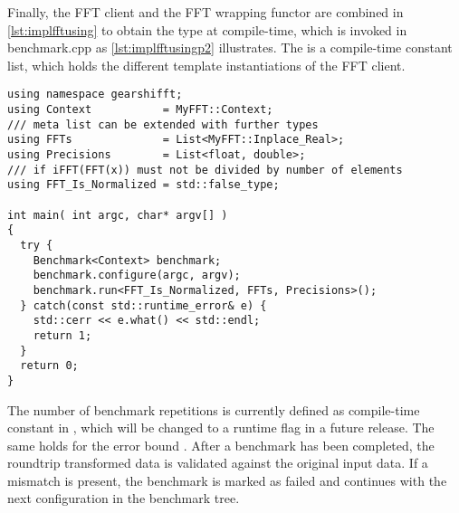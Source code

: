 Finally, the FFT client and the FFT wrapping functor are combined in \cref{lst:implfftusing} to obtain the type at compile-time, which is invoked in benchmark.cpp as \cref{lst:implfftusingp2} illustrates. The  is a compile-time constant list, which holds the different template instantiations of the FFT client. 

\begin{lstlisting}[caption={Using FFT client types to run the benchmarks},label={lst:implfftusingp2}]
using namespace gearshifft;
using Context           = MyFFT::Context;         
/// meta list can be extended with further types
using FFTs              = List<MyFFT::Inplace_Real>;
using Precisions        = List<float, double>;   
/// if iFFT(FFT(x)) must not be divided by number of elements
using FFT_Is_Normalized = std::false_type;       

int main( int argc, char* argv[] )                       
{                                                        
  try {                                                  
    Benchmark<Context> benchmark;
    benchmark.configure(argc, argv);                     
    benchmark.run<FFT_Is_Normalized, FFTs, Precisions>();
  } catch(const std::runtime_error& e) {
    std::cerr << e.what() << std::endl;                  
    return 1;                                            
  }                                                      
  return 0;                                              
}                                                        
\end{lstlisting}

The number of benchmark repetitions is currently defined as compile-time constant in , which will be changed to a runtime flag in a future release.
The same holds for the error bound . After a benchmark has been completed, the roundtrip transformed data is validated against the original input data. If a mismatch is present, the benchmark is marked as failed and \gearshifft{} continues with the next configuration in the benchmark tree.

